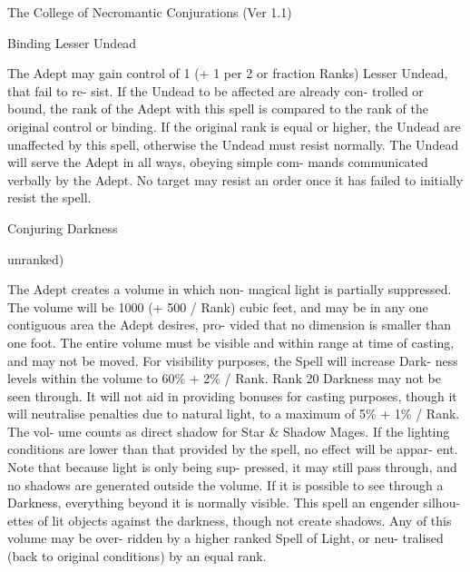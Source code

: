 \begin{Chapter}{The College of Necromantic Conjurations (Ver 1.1)}
\begin{spell}[G-2]{Binding Lesser Undead }
\begin{effects}
The Adept may gain control of 1 (+ 1 per 2 
or  fraction  Ranks)  Lesser  Undead,  that  fail  to  re-
sist.  If  the  Undead  to  be  affected  are  already  con-
trolled  or  bound,  the  rank  of  the  Adept  with  this 
spell is compared to the rank of the original control 
or  binding.  If  the  original  rank  is  equal  or  higher, 
the  Undead  are  unaffected by  this  spell,  otherwise 
the Undead must resist normally. The Undead will 
serve  the  Adept  in  all  ways,  obeying  simple  com-
mands  communicated  verbally  by  the  Adept.  No 
target  may  resist  an  order  once  it  has  failed  to 
initially resist the spell. 

\end{effects}
\end{spell}

\begin{spell}[G-3]{Conjuring Darkness }

unranked) 
\begin{effects}
The Adept creates a volume in which non-
magical  light  is  partially  suppressed.  The  volume 
will be 1000 (+ 500 / Rank) cubic feet, and may be 
in any one contiguous area the Adept desires, pro-
vided  that  no  dimension  is  smaller  than  one  foot. 
The entire volume must be visible and within range 
at  time  of  casting,  and  may  not  be  moved.  For 
visibility  purposes,  the  Spell  will  increase  Dark-
ness levels within the volume to 60\% + 2\% / Rank. 
Rank 20 Darkness may not be seen through. It will 
not  aid  in  providing  bonuses  for  casting  purposes, 
though  it  will  neutralise  penalties  due  to  natural 
light, to a maximum of 5\% + 1\% / Rank. The vol-
ume  counts  as  direct  shadow  for  Star  \&  Shadow 
Mages.  If  the  lighting  conditions  are  lower  than 
that provided by the spell, no effect  will be appar-
ent.  Note  that  because  light  is  only  being  sup-
pressed, it may still pass through, and no shadows 
are generated outside the volume. If it is possible to 
see  through  a  Darkness,  everything  beyond  it  is 
normally  visible.  This  spell  an  engender  silhou-
ettes of lit objects against the darkness, though not 
create  shadows.  Any  of  this  volume  may  be  over-
ridden  by  a  higher  ranked  Spell  of  Light,  or  neu-
tralised  (back  to  original  conditions)  by  an  equal 
rank. 


\end{effects}
\end{spell}
\end{Chapter}
